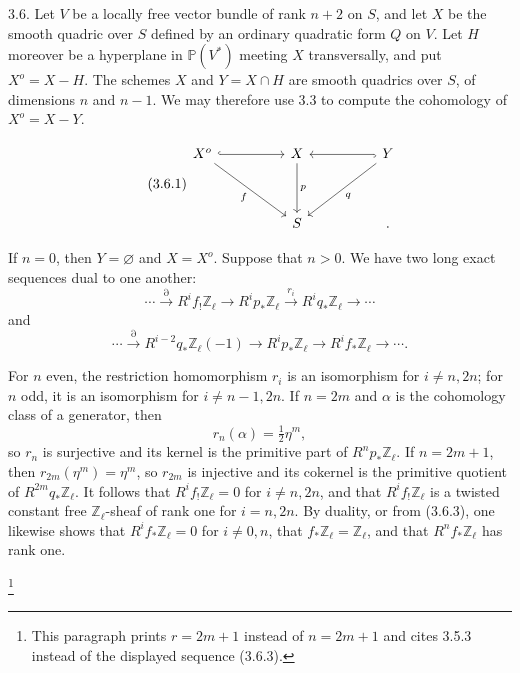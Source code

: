 3.6. Let $V$ be a locally free vector bundle of rank $n+2$ on $S$, and
let $X$ be the smooth quadric over $S$ defined by an ordinary quadratic
form $Q$ on $V$.  Let $H$ moreover be a hyperplane in
$\mathbb P(V^*)$ meeting $X$ transversally, and put $X^o=X-H$.  The
schemes $X$ and $Y=X\cap H$ are smooth quadrics over $S$, of dimensions
$n$ and $n-1$.  We may therefore use 3.3 to compute the cohomology of
$X^o=X-Y$.


\begin{equation}\tag{3.6.1}
\begin{tikzcd}[column sep=huge,row sep=huge]
X^o \arrow[r,hook] \arrow[rd,"f"']
  & X \arrow[d,"p"]
  & Y \arrow[l,hook] \arrow[ld,"q"]\\
{} & S & \mathord{.}
\end{tikzcd}
\end{equation}

If $n=0$, then $Y=\varnothing$ and $X=X^o$.  Suppose that $n>0$.  We
have two long exact sequences dual to one another:
\begin{equation}\tag{3.6.2}
\cdots\xrightarrow{\partial}R^if_!\mathbb Z_\ell
\longrightarrow R^ip_*\mathbb Z_\ell
\xrightarrow{r_i}R^iq_*\mathbb Z_\ell\longrightarrow\cdots
\end{equation}
and
\begin{equation}\tag{3.6.3}
\cdots\xrightarrow{\partial}R^{i-2}q_*\mathbb Z_\ell(-1)
\longrightarrow R^ip_*\mathbb Z_\ell
\longrightarrow R^if_*\mathbb Z_\ell\longrightarrow\cdots.
\end{equation}

For $n$ even, the restriction homomorphism $r_i$ is an isomorphism for
$i\neq n,2n$; for $n$ odd, it is an isomorphism for $i\neq n-1,2n$.  If
$n=2m$ and $\alpha$ is the cohomology class of a generator, then
\begin{equation*}
r_n(\alpha)=\tfrac12\eta^m,
\end{equation*}
so $r_n$ is surjective and its kernel is the primitive part of
$R^np_*\mathbb Z_\ell$.  If $n=2m+1$, then
$r_{2m}(\eta^m)=\eta^m$, so $r_{2m}$ is injective and its cokernel is the
primitive quotient of $R^{2m}q_*\mathbb Z_\ell$.  It follows that
$R^if_!\mathbb Z_\ell=0$ for $i\neq n,2n$, and that
$R^if_!\mathbb Z_\ell$ is a twisted constant free
$\mathbb Z_\ell$-sheaf of rank one for $i=n,2n$.  By duality, or from
(3.6.3), one likewise shows that $R^if_*\mathbb Z_\ell=0$ for
$i\neq0,n$, that $f_*\mathbb Z_\ell=\mathbb Z_\ell$, and that
$R^nf_*\mathbb Z_\ell$ has rank one.

\footnote{This paragraph prints $r=2m+1$ instead of $n=2m+1$ and cites
3.5.3 instead of the displayed sequence (3.6.3).}

